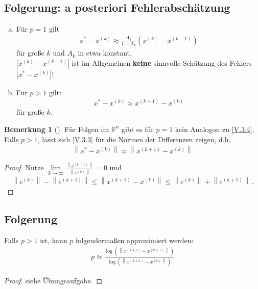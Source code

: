 \documentclass[ngerman,fontsize=11pt, paper=a4, parskip=half, titlepage=true, toc=bib]{scrbook}
\theoremstyle{definition}
\newtheorem{Bem}[Def]{Bemerkung}	%
\theoremstyle{plain}
\newcommand{\R}{\mathds{R}}
\newcommand{\nn}[1]{\left\| #1 \right\|}
\newcommand{\subsectione}[1]{\subsection{#1} \addtocounter{Def}{1}}
\newenvironment{Beme}[1][]{ %
	\begin{Bem}[#1]
	}
	{
	\end{Bem}
	\addtocounter{subsection}{1}
}
\begin{document}
  \subsectione{Folgerung: a posteriori Fehlerabschätzung}
  \begin{enumerate}[a)]
  \item Für $p=1$ gilt
    \begin{gather}
      x^{*}-x^{(k)} \approx \frac{A_k}{1-A_k}(x^{(k)}-x^{(k-1)})
      \label{V.3.4}
    \end{gather}
    für große $k$ und $A_k$ in etwa konstant. \\
    $|x^{(k)}-x^{(k-1)}|$ ist im Allgemeinen \textbf{keine} sinnvolle Schätzung
    des Fehlers $|x^{*}-x^{(k)}|$!
  \item Für $p>1$ gilt:
    \begin{gather}
      x^{*}-x^{(k)} \approx x^{(k+1)}-x^{(k)}
      \label{V.3.5}
    \end{gather}
    für große $k$.
  \end{enumerate}
  
  \begin{Beme}
  	Für Folgen im $\R^n$ gibt es für $p=1$ kein Analogon zu \eqref{V.3.4}.
  	Falls $p>1$, lässt sich \eqref{V.3.3} für die Normen der Differenzen zeigen,
  	d.h.
  	\begin{gather}
  	\nn{x^{*}-x^{(k)}} \approx \nn{x^{(k+1)}-x^{(k)}}
  	\label{V.3.6}
  	\end{gather}
  	
  	\begin{proof}
  		Nutze $\lim\limits_{k\rightarrow\infty} \frac{\nn{e^{(k+1)}}}{\nn{e^{(k)}}} =0$
  		und 
  		\begin{gather*}
  		\nn{e^{(k)}}-\nn{e^{(k+1)}}\leq \nn{x^{(k+1)}-x^{(k)}} \leq \nn{e^{(k)}}+\nn{e^{(k+1)}} \, .
  		\end{gather*}
  	\end{proof}
  \end{Beme}
  
  
  \subsectione{Folgerung}
  Falls $p>1$ ist, kann $p$ folgendermaßen approximiert werden:
  \begin{gather*}
    p \approx \frac{\log(\nn{x^{(k+2)}-x^{(k+1)}})}{\log(\nn{x^{(k+1)}-x^{(k)}})}
  \end{gather*}
  
  \begin{proof}
    siehe Übungsaufgabe.
  \end{proof}
  
\end{document}
